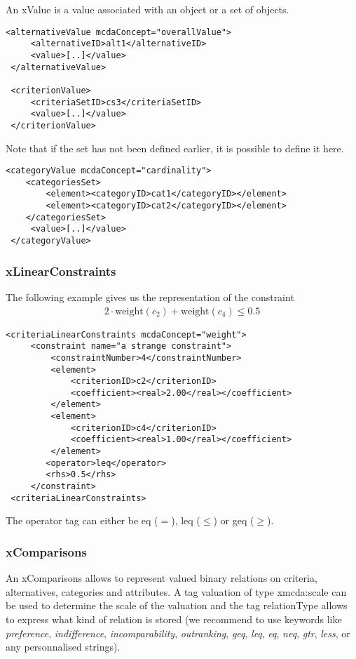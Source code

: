 \documentclass[a4paper,oneside,10 pt]{article}
\newcommand{\code}{\asciifamily}
\begin{document}
An {\code x}Value is a value associated with an object or a set of objects. 
{\code
\begin{lstlisting}[style=prototype]
 <alternativeValue mcdaConcept="overallValue">
	 <alternativeID>alt1</alternativeID>
	 <value>[..]</value>
 </alternativeValue>

 <criterionValue>
	 <criteriaSetID>cs3</criteriaSetID>
	 <value>[..]</value>
 </criterionValue>
\end{lstlisting}
}

Note that if the set has not been defined earlier, it is possible to define it here. 
{\code
\begin{lstlisting}[style=prototype]
 <categoryValue mcdaConcept="cardinality">
	<categoriesSet>
		<element><categoryID>cat1</categoryID></element>
		<element><categoryID>cat2</categoryID></element>
	</categoriesSet>
	 <value>[..]</value>
 </categoryValue>
\end{lstlisting}
}

\subsubsection{{\code x}LinearConstraints}

The following example gives us the representation of the constraint
\begin{eqnarray*}
	2\cdot \mbox{weight}(c_{2})+\mbox{weight}(c_{4}) \leq 0.5
\end{eqnarray*}
{\code
\begin{lstlisting}[style=prototype]
 <criteriaLinearConstraints mcdaConcept="weight">
	 <constraint name="a strange constraint">
		 <constraintNumber>4</constraintNumber>
		 <element>
			 <criterionID>c2</criterionID>
			 <coefficient><real>2.00</real></coefficient>
		 </element>
		 <element>
			 <criterionID>c4</criterionID>
			 <coefficient><real>1.00</real></coefficient>
		 </element>
		<operator>leq</operator>
		<rhs>0.5</rhs>
	 </constraint>
 <criteriaLinearConstraints>
\end{lstlisting}
}

The {\code operator} tag can either be {\code eq} ($=$), {\code leq} ($\leq$) or {\code geq} ($\geq$). 

\subsubsection{{\code x}Comparisons}

An {\code x}Comparisons allows to represent valued binary relations on criteria, alternatives, categories and attributes. A tag {\code valuation} of type {\code xmcda:scale} can be used to determine the scale of the valuation and the tag {\code relationType} allows to express what kind of relation is stored (we recommend to use keywords like \textit{preference}, \textit{indifference}, \textit{incomparability}, \textit{outranking}, \textit{geq}, \textit{leq}, \textit{eq}, \textit{neq}, \textit{gtr}, \textit{less}, or any personnalised strings). 
\end{document}

